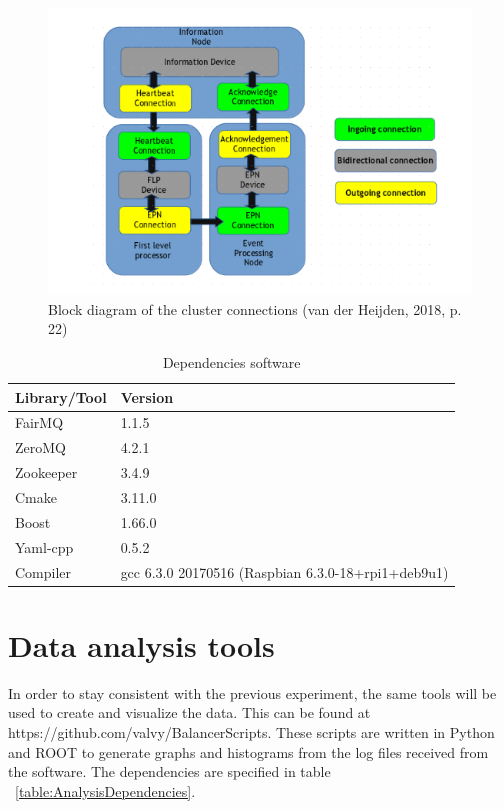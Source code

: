 \begin{figure}[htb]
    \centering
    \includegraphics[scale=0.7]{./graphics/connection_diagram.png}
    \caption{Block diagram of the cluster connections (van der Heijden, 2018, p. 22)}
    \label{SoftwareFigure}
\end{figure}

\begin{table}[htb]
\begin{tabular}{| l | l |}
\hline
Library/Tool & Version \\ \hline
FairMQ & 1.1.5\\ \hline
ZeroMQ & 4.2.1\\ \hline
Zookeeper & 3.4.9 \\ \hline
Cmake & 3.11.0 \\ \hline
Boost & 1.66.0 \\ \hline
Yaml-cpp & 0.5.2 \\ \hline
Compiler & gcc 6.3.0 20170516 (Raspbian 6.3.0-18+rpi1+deb9u1)\\ \hline
\end{tabular}
\caption{Dependencies software}
\label{SoftwareDependencies}
\end{table}

\newpage
\newpage

\section{Data analysis tools}
In order to stay consistent with the previous experiment, the same tools will be used to create and visualize the data. This can be found at \\ https://github.com/valvy/BalancerScripts. These scripts are written in Python and ROOT to generate graphs and histograms from the log files received from the software. The dependencies are specified in table ~\ref{table:AnalysisDependencies}.

